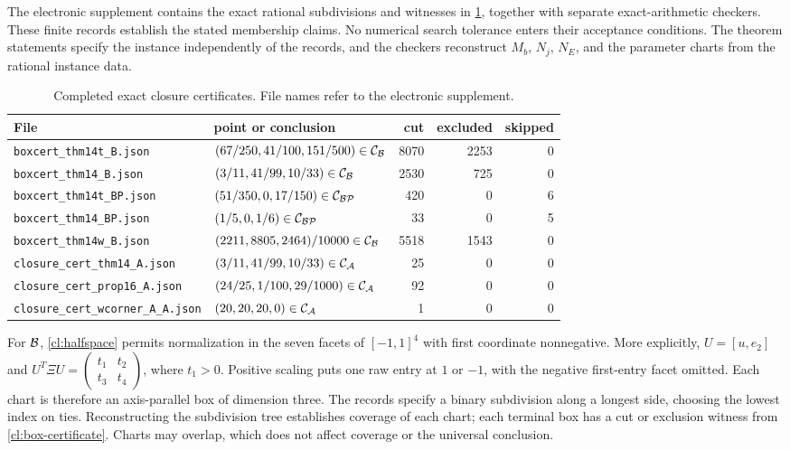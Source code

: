 The electronic supplement contains the exact rational subdivisions and
witnesses in \cref{cl:certificate-list}, together with separate
exact-arithmetic checkers. These finite records establish the stated
membership claims. No numerical search tolerance enters their acceptance
conditions. The theorem statements specify the instance independently of
the records, and the checkers reconstruct $M_b$, $N_j$, $N_E$, and the
parameter charts from the rational instance data.

\begin{table}[htbp]
\centering\small
\caption{Completed exact closure certificates. File names refer to the
electronic supplement.}\label{cl:certificate-list}
\begin{tabular}{llrrr}
\toprule
File & point or conclusion & cut & excluded & skipped\\
\midrule
\texttt{boxcert\_thm14t\_B.json} & $(67/250,41/100,151/500)\in\mathcal C_{\mathcal B}$ &8070&2253&0\\
\texttt{boxcert\_thm14\_B.json} & $(3/11,41/99,10/33)\in\mathcal C_{\mathcal B}$ &2530&725&0\\
\texttt{boxcert\_thm14t\_BP.json} & $(51/350,0,17/150)\in\mathcal C_{\mathcal {BP}}$ &420&0&6\\
\texttt{boxcert\_thm14\_BP.json} & $(1/5,0,1/6)\in\mathcal C_{\mathcal {BP}}$ &33&0&5\\
\texttt{boxcert\_thm14w\_B.json} & $(2211,8805,2464)/10000\in\mathcal C_{\mathcal B}$ &5518&1543&0\\
\midrule
\texttt{closure\_cert\_thm14\_A.json} & $(3/11,41/99,10/33)\in\mathcal C_{\mathcal A}$ &25&0&0\\
\texttt{closure\_cert\_prop16\_A.json} & $(24/25,1/100,29/1000)\in\mathcal C_{\mathcal A}$ &92&0&0\\
\texttt{closure\_cert\_wcorner\_A\_A.json} & $(20,20,20,0)\in\mathcal C_{\mathcal A}$ &1&0&0\\
\bottomrule
\end{tabular}
\end{table}

For $\mathcal B$, \cref{cl:halfspace} permits normalization in the seven
facets of $[-1,1]^4$ with first coordinate nonnegative.
More explicitly, $U=[u,e_2]$ and
$U^T\Xi U=\left(\begin{smallmatrix}t_1&t_2\\t_3&t_4\end{smallmatrix}\right)$,
where $t_1>0$. Positive scaling puts one raw entry at $1$ or $-1$,
with the negative first-entry facet omitted. Each chart is therefore an
axis-parallel box of dimension three. The records specify a binary
subdivision along a longest side, choosing the lowest index on ties.
Reconstructing the subdivision tree establishes coverage of each chart;
each terminal box has a cut or exclusion witness from
\cref{cl:box-certificate}. Charts may overlap, which does not affect
coverage or the universal conclusion.

